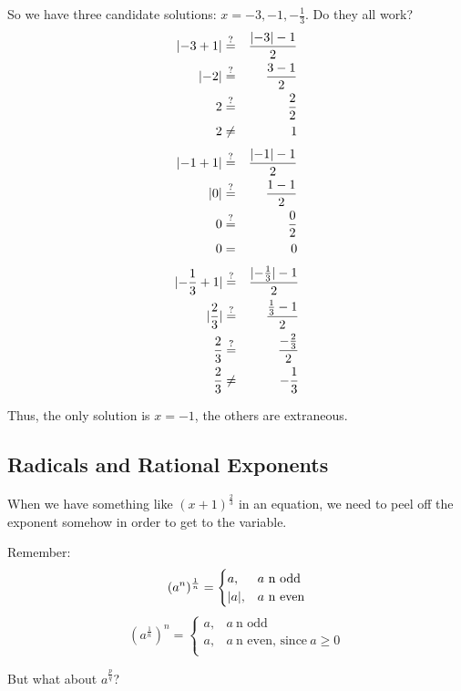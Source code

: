\documentclass[letterpaper,12pt,fleqn]{article}
\newcommand{\qe}{\overset{?}{=}}
\begin{document}
So we have three candidate solutions: $x=-3,-1,-\frac{1}{3}$. Do they all
work?
\begin{eqnarray*}
  \abs{-3+1} &\qe& \frac{\abs{-3}-1}{2} \\
  \abs{-2} &\qe& \frac{3-1}{2} \\
  2 &\qe& \frac{2}{2} \\
  2 &\ne& 1 \\
\end{eqnarray*}
\begin{eqnarray*}
  \abs{-1+1} &\qe& \frac{\abs{-1}-1}{2} \\
  \abs{0} &\qe& \frac{1-1}{2} \\
  0 &\qe& \frac{0}{2} \\
  0 &=& 0 \\
\end{eqnarray*}
\begin{eqnarray*}
  \abs{-\frac{1}{3}+1} &\qe& \frac{\abs{-\frac{1}{3}}-1}{2} \\
  \abs{\frac{2}{3}} &\qe& \frac{\frac{1}{3}-1}{2} \\
  \frac{2}{3} &\qe& \frac{-\frac{2}{3}}{2} \\
  \frac{2}{3} &\ne& -\frac{1}{3} \\
\end{eqnarray*}

Thus, the only solution is $x=-1$, the others are extraneous.

\subsection*{Radicals and Rational Exponents}

When we have something like $(x+1)^{\frac{2}{3}}$ in an equation, we need to peel
off the exponent somehow in order to get to the variable.

Remember:
\[(a^n)^{\frac{1}{n}}=\begin{cases}
a, & a\ \mbox{n odd} \\
\lvert a\rvert, & a\ \mbox{n even} \\
\end{cases}\]
\[(a^{\frac{1}{n}})^n=\begin{cases}
a, & a\ \mbox{n odd} \\
a, & a\ \mbox{n even, since}\ a\ge0 \\
\end{cases}\]

But what about $a^{\frac{p}{q}}$?
\end{document}
